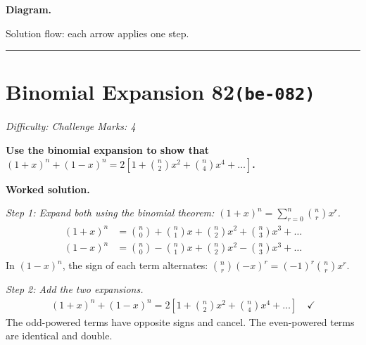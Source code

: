 \documentclass[11pt]{article}
\newcommand{\question}[1]{\par\medskip\noindent\textbf{#1}\par}
\begin{document}
\textbf{Diagram.}

\begin{center}
\end{center}
\small Solution flow: each arrow applies one step.\normalsize

\medskip\hrule

\section*{Binomial Expansion 82\quad\small\texttt{(be-082)}}
\textit{Difficulty: Challenge \quad\textbar\quad Marks: 4}

\question{Use the binomial expansion to show that \( (1+x)^n + (1-x)^n = 2\left[1 + \binom{n}{2}x^2 + \binom{n}{4}x^4 + \ldots\right] \).}

\textbf{Worked solution.}

\textit{Step 1: Expand both using the binomial theorem: \((1+x)^n = \sum_{r=0}^{n} \binom{n}{r} x^r\).}
\[\begin{gathered}
\begin{aligned} (1+x)^n &= \binom{n}{0} + \binom{n}{1}x + \binom{n}{2}x^2 + \binom{n}{3}x^3 + \ldots \\ (1-x)^n &= \binom{n}{0} - \binom{n}{1}x + \binom{n}{2}x^2 - \binom{n}{3}x^3 + \ldots \end{aligned}
\end{gathered}\]
In \((1-x)^n\), the sign of each term alternates: \(\binom{n}{r}(-x)^r = (-1)^r \binom{n}{r} x^r\).

\textit{Step 2: Add the two expansions.}
\[\begin{gathered}
(1+x)^n + (1-x)^n = 2\left[1 + \binom{n}{2}x^2 + \binom{n}{4}x^4 + \ldots\right] \quad \checkmark
\end{gathered}\]
The odd-powered terms have opposite signs and cancel. The even-powered terms are identical and double.
\end{document}
